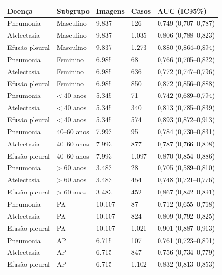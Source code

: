 \begin{tabular}{lllll}
\toprule
Doença & Subgrupo & Imagens & Casos & AUC (IC95\%) \\
\midrule
Pneumonia & Masculino & 9.837 & 126 & 0,749 (0,707–0,787) \\
Atelectasia & Masculino & 9.837 & 1.035 & 0,806 (0,788–0,823) \\
Efusão pleural & Masculino & 9.837 & 1.273 & 0,880 (0,864–0,894) \\
Pneumonia & Feminino & 6.985 & 68 & 0,766 (0,705–0,822) \\
Atelectasia & Feminino & 6.985 & 636 & 0,772 (0,747–0,796) \\
Efusão pleural & Feminino & 6.985 & 850 & 0,872 (0,856–0,888) \\
Pneumonia & < 40 anos & 5.345 & 71 & 0,742 (0,689–0,794) \\
Atelectasia & < 40 anos & 5.345 & 340 & 0,813 (0,785–0,839) \\
Efusão pleural & < 40 anos & 5.345 & 574 & 0,893 (0,872–0,913) \\
Pneumonia & 40–60 anos & 7.993 & 95 & 0,784 (0,730–0,831) \\
Atelectasia & 40–60 anos & 7.993 & 877 & 0,787 (0,766–0,808) \\
Efusão pleural & 40–60 anos & 7.993 & 1.097 & 0,870 (0,854–0,886) \\
Pneumonia & > 60 anos & 3.483 & 28 & 0,705 (0,589–0,810) \\
Atelectasia & > 60 anos & 3.483 & 454 & 0,748 (0,721–0,776) \\
Efusão pleural & > 60 anos & 3.483 & 452 & 0,867 (0,842–0,891) \\
Pneumonia & PA & 10.107 & 87 & 0,712 (0,655–0,768) \\
Atelectasia & PA & 10.107 & 824 & 0,809 (0,792–0,825) \\
Efusão pleural & PA & 10.107 & 1.021 & 0,901 (0,887–0,913) \\
Pneumonia & AP & 6.715 & 107 & 0,761 (0,723–0,801) \\
Atelectasia & AP & 6.715 & 847 & 0,756 (0,734–0,779) \\
Efusão pleural & AP & 6.715 & 1.102 & 0,832 (0,813–0,853) \\
\bottomrule
\end{tabular}
